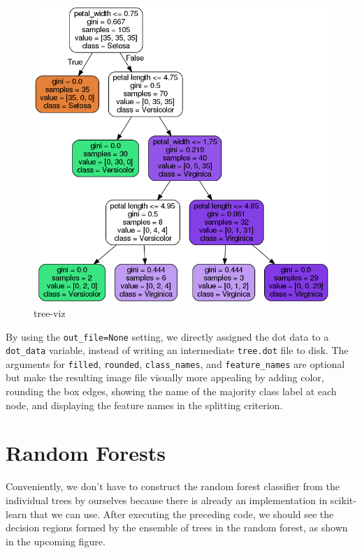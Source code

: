 \documentclass[11pt]{article}
\makeatletter
\def\maxwidth{\ifdim\Gin@nat@width>\linewidth\linewidth
    \else\Gin@nat@width\fi}
\let\Oldincludegraphics\includegraphics
\renewcommand{\includegraphics}[1]{\Oldincludegraphics[width=.8\maxwidth]{#1}}
\makeatother
\begin{document}
    \begin{figure}
\centering
\includegraphics{tree.png}
\caption{tree-viz}
\end{figure}

    By using the \texttt{out\_file=None} setting, we directly assigned the
dot data to a \texttt{dot\_data} variable, instead of writing an
intermediate \texttt{tree.dot} file to disk. The arguments for
\texttt{filled}, \texttt{rounded}, \texttt{class\_names}, and
\texttt{feature\_names} are optional but make the resulting image file
visually more appealing by adding color, rounding the box edges, showing
the name of the majority class label at each node, and displaying the
feature names in the splitting criterion.

    \section{Random Forests}\label{random-forests}

Conveniently, we don't have to construct the random forest classifier
from the individual trees by ourselves because there is already an
implementation in scikit-learn that we can use. After executing the
preceding code, we should see the decision regions formed by the
ensemble of trees in the random forest, as shown in the upcoming figure.
\end{document}
